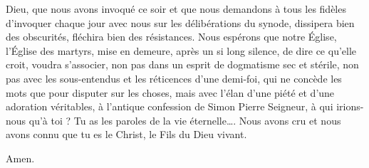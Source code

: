 Dieu, que nous avons invoqué ce soir et que nous demandons à tous les fidèles d’invoquer chaque jour avec nous sur les délibérations du synode, dissipera bien des obscurités, fléchira bien des résistances. Nous espérons que notre Église, l’Église des martyrs, mise en demeure, après un si long silence, de dire ce qu’elle croit, voudra s’associer, non pas dans un esprit de dogmatisme sec et stérile, non pas avec les sous-entendus et les réticences d’une demi-foi, qui ne concède les mots que pour disputer sur les choses, mais avec l’élan d’une piété et d’une adoration véritables, à l’antique confession de Simon Pierre\frcolon{} \Og{} Seigneur, à qui irions-nous qu’à toi ? Tu as les paroles de la vie éternelle…. Nous avons cru et nous avons connu que tu es le Christ, le Fils du Dieu vivant. \Fg{}

Amen.     

